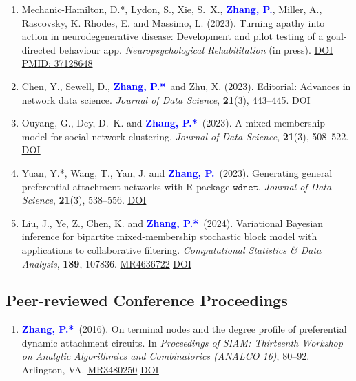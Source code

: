 \documentclass[12pt]{article}
\def\MR#1{\href{http://www.ams.org/mathscinet-getitem?mr=#1}{MR#1}}
\def\DOI#1{\href{http://doi.org/#1}{\underline{DOI}}}
\def\PMID#1{\href{https://pubmed.ncbi.nlm.nih.gov/#1}
{PMID: #1}}
\newcommand{\PZ}{\textcolor{blue}{\textbf{Zhang, P.*}}}
\newcommand{\PZnot}{\textcolor{blue}{\textbf{Zhang, P.}}}
\begin{document}
\begin{enumerate}
		\item {\sc Mechanic-Hamilton, D.*, Lydon, S., Xie, S.\ X.,} 
		\PZnot, {\sc Miller, A., Rascovsky, K. Rhodes, E.} and {\sc 
		Massimo, L.} (2023). Turning apathy into action in 
		neurodegenerative disease: Development and pilot testing of 
		a goal-directed behaviour app. {\em Neuropsychological 
		Rehabilitation} (in press). 
		\DOI{10.1080/09602011.2023.2203403} \PMID{37128648}
		
		\item {\sc Chen, Y., Sewell, D.,} \PZ\ and Zhu, X. (2023). 
		Editorial: Advances in network data science. {\em Journal of 
		Data Science}, {\bf 21}(3), 443--445.
		\href{https://doi.org/10.6339/23-JDS213EDI}{\underline{DOI}}
		
		\item {\sc Ouyang, G., Dey, D.\ K.} and \PZ\ (2023). 
		A mixed-membership model for social network clustering. {\em 
		Journal of Data Science}, {\bf 21}(3), 508--522.
		\href{https://doi.org/10.6339/23-JDS1109}{\underline{DOI}}
		
		\item {\sc Yuan, Y.*, Wang, T., Yan, J.} and \PZnot\ (2023). 
		Generating general preferential attachment networks with R 
		package $\mathtt{wdnet}$. {\em Journal of Data Science}, 
		{\bf 21}(3), 538--556.
		\href{https://doi.org/10.6339/23-JDS1110}{\underline{DOI}}
		
		\item {\sc Liu, J., Ye, Z., Chen, K.} and \PZ\ (2024). 
		Variational Bayesian inference for bipartite 
		mixed-membership stochastic block model with applications to 
		collaborative filtering. {\em Computational Statistics \& 
		Data Analysis}, {\bf 189}, 107836. \MR{4636722} 
		\DOI{10.1016/j.csda.2023.107836}
\end{enumerate} 
	
	\subsection*{Peer-reviewed Conference Proceedings}
	\begin{enumerate}
		\item \PZ\ (2016). On terminal nodes and the degree 
		profile of preferential dynamic attachment circuits. In 
		\emph{Proceedings of SIAM: Thirteenth Workshop on Analytic 
		Algorithmics and Combinatorics (ANALCO 16)}, 80--92. 
		Arlington, VA. \MR{3480250} \DOI{10.1137/1.9781611974324.9}
	\end{enumerate}
	
\end{document}
